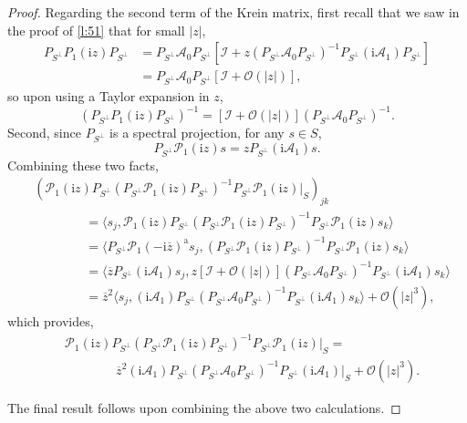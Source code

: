 \documentclass[review,onefignum,onetabnum]{siamart171218}
\newcommand{\rma}{\mathrm{a}}
\newcommand{\rmi}{\mathrm{i}}
\newcommand{\calA}{\mathcal{A}}
\newcommand{\calI}{\mathcal{I}}
\newcommand{\calO}{\mathcal{O}}
\newcommand{\calP}{\mathcal{P}}
\begin{document}
\begin{proof}
Regarding the second term of the Krein matrix, first recall that we saw in the proof of \cref{l:51} that for small $|z|$,
\[
\begin{aligned}
P_{S^\perp}P_1(\rmi z)P_{S^\perp}&=P_{S^\perp}\calA_0P_{S^\perp}
\left[\calI+z
\left(P_{S^\perp}\calA_0P_{S^\perp}\right)^{-1}P_{S^\perp}(\rmi\calA_1)P_{S^\perp}\right]\\
&=P_{S^\perp}\calA_0P_{S^\perp}\left[\calI+\calO(|z|)\right],
\end{aligned}
\]
so upon using a Taylor expansion in $z$,
\[
\left(P_{S^\perp}P_1(\rmi z)P_{S^\perp}\right)^{-1}=
\left[\calI+\calO(|z|)\right]\left(P_{S^\perp}\calA_0P_{S^\perp}\right)^{-1}.
\]
Second, since $P_{S^\perp}$ is a spectral projection, for any $s\in S$,
\[
P_{S^\perp}\calP_1(\rmi z)s=zP_{S^\perp}(\rmi\calA_1)s.
\]
Combining these two facts,
\[
\begin{aligned}
&\left(\calP_1(\rmi z)P_{S^\perp}(P_{S^\perp}\calP_1(\rmi z)P_{S^\perp})^{-1}P_{S^\perp}\calP_1(\rmi z)|_{S}\right)_{jk} \\
&\qquad\qquad=
\langle s_j,\calP_1(\rmi z)P_{S^\perp}(P_{S^\perp}\calP_1(\rmi z)P_{S^\perp})^{-1}P_{S^\perp}\calP_1(\rmi z)s_k\rangle \\
     &\qquad\qquad=\langle P_{S^\perp}\calP_1(-\rmi\overline{z})^\rma s_j,(P_{S^\perp}\calP_1(\rmi z)P_{S^\perp})^{-1}P_{S^\perp}\calP_1(\rmi z)s_k\rangle\\
     &\qquad\qquad=\langle\overline{z}P_{S^\perp}(\rmi\calA_1)s_j,
z\left[\calI+\calO(|z|)\right]\left(P_{S^\perp}\calA_0P_{S^\perp}\right)^{-1}
P_{S^\perp}(\rmi\calA_1)s_k\rangle\\
&\qquad\qquad=\overline{z}^2\langle s_j,(\rmi\calA_1)P_{S^\perp}\left(P_{S^\perp}\calA_0P_{S^\perp}\right)^{-1}
P_{S^\perp}(\rmi\calA_1)s_k\rangle+\calO(|z|^3),
\end{aligned}
\]
which provides,
\[
\begin{aligned}
&\calP_1(\rmi z)P_{S^\perp}(P_{S^\perp}\calP_1(\rmi z)P_{S^\perp})^{-1}P_{S^\perp}\calP_1(\rmi z)|_{S}=\\
&\qquad\qquad\overline{z}^2
(\rmi\calA_1)P_{S^\perp}\left(P_{S^\perp}\calA_0P_{S^\perp}\right)^{-1}P_{S^\perp}(\rmi\calA_1)|_S
+\calO(|z|^3).
\end{aligned}
\]

The final result follows upon combining the above two calculations.
\end{proof}
\end{document}
